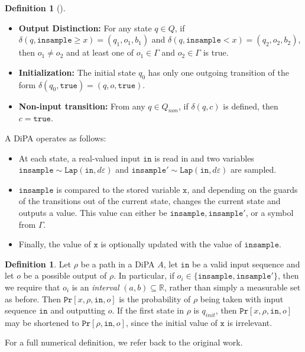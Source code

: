 \documentclass[12pt]{article}
\newcommand{\RR}{\mathbb{R}}
\newcommand{\gguard}[1][x]{\texttt{insample}\geq #1}
\newcommand{\lguard}[1][x]{\texttt{insample} < #1}
\newcommand{\Lap}{\texttt{Lap}}
\theoremstyle{definition}
\newtheorem{defn}[thm]{Definition}
\begin{document}
\begin{defn}[\cite{chadhaLinearTimeDecidability2021}]
\begin{itemize}
        \item \textbf{Output Distinction:} For any state $q\in Q$, if $\delta(q, \gguard) = (q_1, o_1, b_1)$ and $\delta(q, \lguard) = (q_2, o_2, b_2)$, then $o_1\neq o_2$ and at least one of $o_1\in \Gamma$ and $o_2\in \Gamma$ is true.

        \item \textbf{Initialization:} The initial state $q_0$ has only one outgoing transition of the form $\delta(q_0, \texttt{true}) = (q, o, \texttt{true})$.

        \item \textbf{Non-input transition:} From any $q\in Q_{non}$, if $\delta(q, c)$ is defined, then $c=\texttt{true}$.
    \end{itemize}
\end{defn}

A DiPA operates as follows: 
\begin{itemize}
    \item At each state, a real-valued input $\texttt{in}$ is read in and two variables $\texttt{insample}\sim \Lap(\texttt{in}, d\varepsilon)$ and $\texttt{insample}'\sim\Lap(\texttt{in}, d\varepsilon)$ are sampled.
    \item $\texttt{insample}$ is compared to the stored variable $\texttt{x}$, and depending on the guards of the transitions out of the current state, changes the current state and outputs a value. This value can either be $\texttt{insample}, \texttt{insample}'$, or a symbol from $\Gamma$.
    \item Finally, the  value of $\texttt{x}$ is optionally updated with the value of $\texttt{insample}$.
\end{itemize}

\begin{defn}
    Let $\rho$ be a path in a DiPA $A$, let $\texttt{in}$ be a valid input sequence and let $o$ be a possible output of $\rho$. In particular, if $o_i\in \{\texttt{insample}, \texttt{insample}'\}$, then we require that $o_i$ is an \textit{interval} $(a, b)\subseteq \RR$, rather than simply a measurable set as before. 
    Then $\texttt{Pr}[x, \rho, \texttt{in}, o]$ is the probability of $\rho$ being taken with input sequence $\texttt{in}$ and outputting $o$. If the first state in $\rho$ is $q_{init}$, then $\texttt{Pr}[x, \rho, \texttt{in}, o]$ may be shortened to $\texttt{Pr}[\rho, \texttt{in}, o]$, since the initial value of $\texttt{x}$ is irrelevant.
\end{defn}

For a full numerical definition, we refer back to the original work. 
\end{document}

